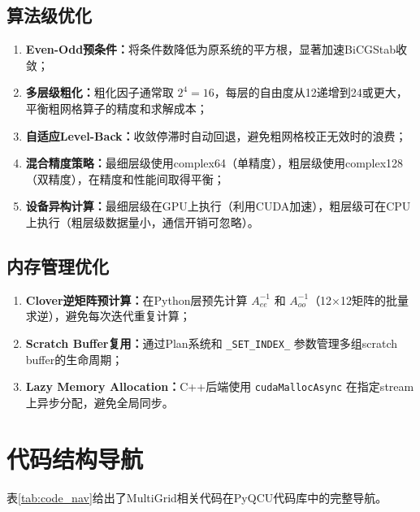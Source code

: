 \documentclass[11pt,a4paper]{article}
\begin{document}
\subsection{算法级优化}

\begin{enumerate}
    \item \textbf{Even-Odd预条件：}将条件数降低为原系统的平方根，显著加速BiCGStab收敛；
    \item \textbf{多层级粗化：}粗化因子通常取 $2^4=16$，每层的自由度从12递增到24或更大，平衡粗网格算子的精度和求解成本；
    \item \textbf{自适应Level-Back：}收敛停滞时自动回退，避免粗网格校正无效时的浪费；
    \item \textbf{混合精度策略：}最细层级使用complex64（单精度），粗层级使用complex128（双精度），在精度和性能间取得平衡；
    \item \textbf{设备异构计算：}最细层级在GPU上执行（利用CUDA加速），粗层级可在CPU上执行（粗层级数据量小，通信开销可忽略）。
\end{enumerate}

\subsection{内存管理优化}

\begin{enumerate}
    \item \textbf{Clover逆矩阵预计算：}在Python层预先计算 $A_{ee}^{-1}$ 和 $A_{oo}^{-1}$（12×12矩阵的批量求逆），避免每次迭代重复计算；
    \item \textbf{Scratch Buffer复用：}通过Plan系统和 \texttt{\_SET\_INDEX\_} 参数管理多组scratch buffer的生命周期；
    \item \textbf{Lazy Memory Allocation：}C++后端使用 \texttt{cudaMallocAsync} 在指定stream上异步分配，避免全局同步。
\end{enumerate}

\section{代码结构导航}

表\ref{tab:code_nav}给出了MultiGrid相关代码在PyQCU代码库中的完整导航。
\end{document}
